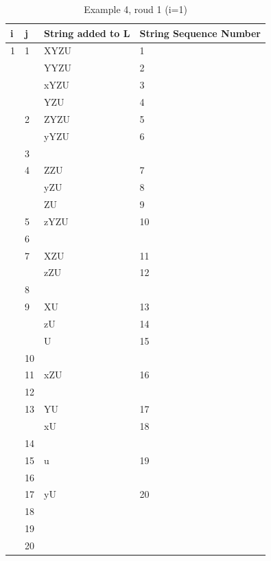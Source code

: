 \documentclass{sig-alternate-05-2015}
\begin{document}
\begin{table}[h]
\centering
\caption{Example 4, roud 1 (i=1)}
\label{table:Example4Roud1}
\begin{tabular}{|l|l|l|l|}
\hline	
i & j  & String added to L & String Sequence Number \\
\hline
1 & 1  & XYZU              & 1                      \\
  &    & YYZU              & 2                      \\
  &    & xYZU              & 3                      \\
  &    & YZU               & 4                      \\
  & 2  & ZYZU              & 5                      \\
  &    & yYZU              & 6                      \\
  & 3  &                   &                        \\
  & 4  & ZZU               & 7                      \\
  &    & yZU               & 8                      \\
  &    & ZU                & 9                      \\
  & 5  & zYZU              & 10                     \\
  & 6  &                   &                        \\
  & 7  & XZU               & 11                     \\
  &    & zZU               & 12                     \\
  & 8  &                   &                        \\
  & 9  & XU                & 13                     \\
  &    & zU                & 14                     \\
  &    & U                 & 15                     \\
  & 10 &                   &                        \\
  & 11 & xZU               & 16                     \\
  & 12 &                   &                        \\
  & 13 & YU                & 17                     \\
  &    & xU                & 18                     \\
  & 14 &                   &                        \\
  & 15 & u                 & 19                     \\
  & 16 &                   &                        \\
  & 17 & yU                & 20                     \\
  & 18 &                   &                        \\
  & 19 &                   &                        \\
  & 20 &                   &            \\      
\hline
\end{tabular}
\end{table}
\end{document}
